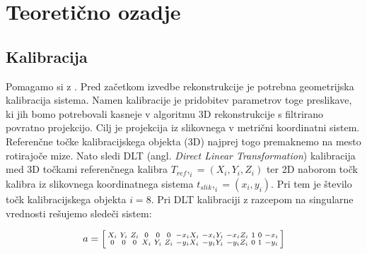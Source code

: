 \documentclass[journal,a4paper,twoside]{sty/IEEEtran}
\begin{document}
\section{Teoretično ozadje}

\subsection{Kalibracija}
Pomagamo si z \cite{spic2}. Pred začetkom izvedbe rekonstrukcije je potrebna geometrijska kalibracija sistema. Namen kalibracije je pridobitev parametrov toge preslikave, ki jih bomo potrebovali kasneje v algoritmu 3D rekonstrukcije s filtrirano povratno projekcijo. Cilj je projekcija iz slikovnega v metrični koordinatni sistem. Referenčne točke kalibracijskega objekta (3D) najprej togo premaknemo na mesto rotirajoče mize. Nato sledi DLT (angl. \textit{Direct Linear Transformation}) kalibracija med 3D točkami referenčnega kalibra $T_{ref},_i = (X_i, Y_i, Z_i)$ ter 2D naborom točk kalibra iz slikovnega koordinatnega sistema $t_{slik},_i = (x_i, y_i)$. Pri tem je število točk kalibracijskega objekta $i = 8$. Pri DLT kalibraciji z razcepom na singularne vrednosti rešujemo sledeči sistem:



\begin{equation}
\setcounter{MaxMatrixCols}{12}
a = 
\begin{bsmallmatrix}
X_i & Y_i & Z_i & 0 & 0 & 0 & -x_i X_i & -x_i Y_i & -x_i Z_i & 1 & 0 & -x_i \\ 
0 & 0 & 0 & X_i & Y_ i& Z_i & -y_i X_i & -y_i Y_i & -y_i Z_i & 0 & 1 & -y_i \\
\end{bsmallmatrix}
\end{equation}
\end{document}
